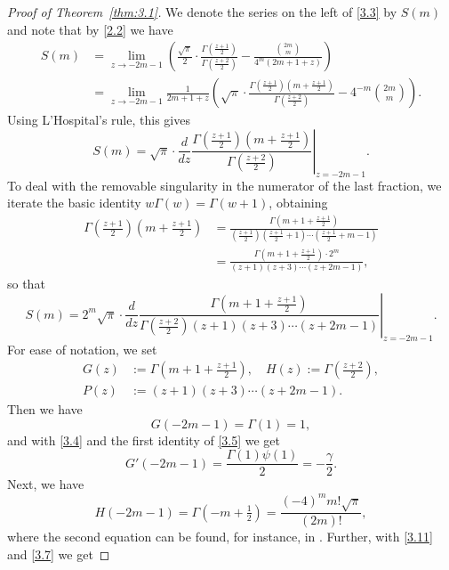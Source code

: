 \documentclass{amsart}
\theoremstyle{definition}
\theoremstyle{remark}
\numberwithin{equation}{section}
\begin{document}
\begin{proof}[Proof of Theorem~\ref{thm:3.1}]
We denote the series on the left of \eqref{3.3} by $S(m)$ and note that by
\eqref{2.2} we have 
\begin{align*}
S(m)&=\lim_{z\to -2m-1}\left(
\frac{\sqrt{\pi}}{2}\cdot\frac{\Gamma(\frac{z+1}{2})}{\Gamma(\frac{z+2}{2})}
-\frac{\binom{2m}{m}}{4^m(2m+1+z)}\right) \\
&=\lim_{z\to -2m-1}\frac{1}{2m+1+z}\left(\sqrt{\pi}
\cdot\frac{\Gamma(\frac{z+1}{2})(m+\frac{z+1}{2})}{\Gamma(\frac{z+2}{2})}
-4^{-m}\binom{2m}{m}\right).
\end{align*}
Using L'Hospital's rule, this gives
\[
S(m)=\sqrt{\pi}\cdot\frac{d}{dz}\left.
\frac{\Gamma(\frac{z+1}{2})(m+\frac{z+1}{2})}{\Gamma(\frac{z+2}{2})}
\right|_{z=-2m-1}.
\]
To deal with the removable singularity in the numerator of the last fraction,
we iterate the basic identity $w\Gamma(w)=\Gamma(w+1)$, obtaining
\begin{align*}
\Gamma(\tfrac{z+1}{2})(m+\tfrac{z+1}{2}) &=\frac{\Gamma(m+1+\frac{z+1}{2})}
{(\frac{z+1}{2})(\frac{z+1}{2}+1)\cdots(\frac{z+1}{2}+m-1)} \\
&=\frac{\Gamma(m+1+\frac{z+1}{2})\cdot 2^m}{(z+1)(z+3)\cdots(z+2m-1)},
\end{align*}
so that
\begin{equation}\label{3.8}
S(m)=2^m\sqrt{\pi}\cdot\frac{d}{dz}\left.
\frac{\Gamma(m+1+\frac{z+1}{2})}{\Gamma(\frac{z+2}{2})(z+1)(z+3)\cdots(z+2m-1)}
\right|_{z=-2m-1}.
\end{equation}
For ease of notation, we set
\begin{align*}
G(z)&:=\Gamma(m+1+\tfrac{z+1}{2}),\quad H(z):=\Gamma(\tfrac{z+2}{2}),\\
P(z)&:=(z+1)(z+3)\cdots(z+2m-1).
\end{align*}
Then we have
\begin{equation}\label{3.9}
G(-2m-1) = \Gamma(1) = 1,
\end{equation}
and with \eqref{3.4} and the first identity of \eqref{3.5} we get
\begin{equation}\label{3.10}
G'(-2m-1) =\frac{\Gamma(1)\psi(1)}{2} = -\frac{\gamma}{2}.
\end{equation}
Next, we have
\begin{equation}\label{3.11}
H(-2m-1) = \Gamma(-m+\tfrac{1}{2}) = \frac{(-4)^m m!\sqrt{\pi}}{(2m)!},
\end{equation}
where the second equation can be found, for instance, in 
\cite[eq.~8.339.3]{GR}. Further, with \eqref{3.11} and \eqref{3.7} we get

\end{proof}
\end{document}
